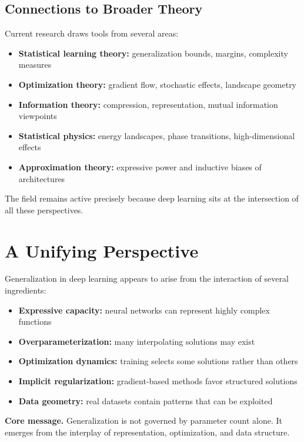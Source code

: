 \subsection{Connections to Broader Theory}

Current research draws tools from several areas:
\begin{itemize}
    \item \textbf{Statistical learning theory:} generalization bounds, margins, complexity measures
    \item \textbf{Optimization theory:} gradient flow, stochastic effects, landscape geometry
    \item \textbf{Information theory:} compression, representation, mutual information viewpoints
    \item \textbf{Statistical physics:} energy landscapes, phase transitions, high-dimensional effects
    \item \textbf{Approximation theory:} expressive power and inductive biases of architectures
\end{itemize}

\medskip

\noindent
The field remains active precisely because deep learning sits at the intersection of all these perspectives.

\section{A Unifying Perspective}

Generalization in deep learning appears to arise from the interaction of several ingredients:

\begin{itemize}
    \item \textbf{Expressive capacity:} neural networks can represent highly complex functions
    \item \textbf{Overparameterization:} many interpolating solutions may exist
    \item \textbf{Optimization dynamics:} training selects some solutions rather than others
    \item \textbf{Implicit regularization:} gradient-based methods favor structured solutions
    \item \textbf{Data geometry:} real datasets contain patterns that can be exploited
\end{itemize}

\medskip

\noindent
\textbf{Core message.}
Generalization is not governed by parameter count alone. It emerges from the interplay of representation, optimization, and data structure.

